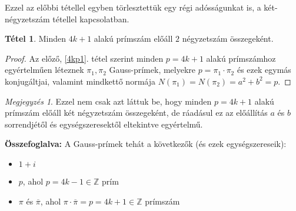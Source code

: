 \documentclass[12pt]{book}
\theoremstyle{plain} %
\theoremstyle{definition} %
\newtheorem{theo/}{Tétel}[section]
\newenvironment{theo}
  {\renewcommand{\qedsymbol}{$\clubsuit$}%
   \pushQED{\qed}\begin{theo/}}
  {\popQED\end{theo/}}
\theoremstyle{remark}
\newtheorem*{mj}{Megjegyzés}
\renewcommand\qedsymbol{$\blacksquare$}
\numberwithin{equation}{section}  %
\def\Z{\mathbb{Z}}
\begin{document}
	Ezzel az előbbi tétellel egyben törlesztettük egy régi adósságunkat is, a két-négyzetszám tétellel kapcsolatban.
	
	\begin{theo}\label{torlesztes}
		Minden $4k+1$ alakú prímszám 
		előáll $2$ négyzetszám összegeként.
	\end{theo}

	\begin{proof}
		Az előző, \ref{4kp1}. tétel szerint minden $p=4k+1$ alakú prímszámhoz egyértelműen léteznek $\pi_1,\pi_2$ Gauss-prímek, melyekre $p=\pi_1\cdot \pi_2$ és ezek egymás konjugáltjai, valamint mindkettő normája $N(\pi_1)=N(\pi_2)=a^2+b^2=p$.
	\end{proof}

	\begin{mj}
		Ezzel nem csak azt láttuk be, hogy minden $p=4k+1$ alakú prímszám előáll két négyzetszám összegeként, de ráadásul ez az előállítás $a$ és $b$ sorrendjétől és egységszeresektől eltekintve egyértelmű. 
	\end{mj}

	\textbf{Összefoglalva: }A Gauss-prímek tehát a következők (és ezek egységszereseik):
	\begin{itemize}
		\item{$1+i$}
		\item{$p$, ahol $p=4k-1\in \Z$ prím}
		\item{$\pi$ és $\overline{\pi}$, ahol $\pi\cdot \overline{\pi}=p=4k+1\in \Z$ prímszám}
	\end{itemize}
	
\end{document}
